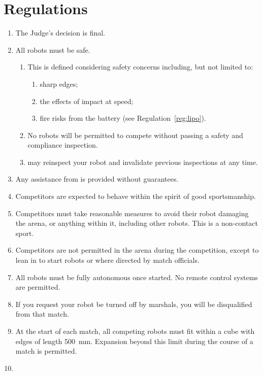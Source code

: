 \section{Regulations}
\label{sec:regs}

\begin{enumerate}
\item The Judge's decision is final.
\item All robots must be safe.
  \begin{enumerate}
    \item This is defined considering safety concerns including, but not limited
          to:
      \begin{enumerate}
        \item sharp edges;
        \item the effects of impact at speed;
        \item fire risks from the battery (see Regulation~\ref{reg:lipo}).
      \end{enumerate}
    \item No robots will be permitted to compete without passing a safety and
          compliance inspection.
    \item \staff may reinspect your robot and invalidate previous inspections at
          any time.
  \end{enumerate}
\item Any assistance from \staff is provided without guarantees.
\item Competitors are expected to behave within the spirit of good
      sportsmanship.
\item Competitors must take reasonable measures to avoid their robot damaging
      the arena, or anything within it, including other robots. This is a
      non-contact sport.
\item Competitors are not permitted in the arena during the competition,
      except to lean in to start robots or where directed by match officials.
\item All robots must be fully autonomous once started. No remote control
      systems are permitted.
\item If you request your robot be turned off by marshals, you will be
      disqualified from that match.
\item At the start of each match, all competing robots must fit within a cube
      with edges of length \SI{500}{mm}. Expansion beyond this limit during the
      course of a match is permitted.
\item \label{reg:lipo}

\end{enumerate}
